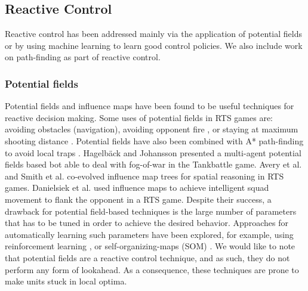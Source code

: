 \documentclass{llncs}
\begin{document}



\subsection*{Reactive Control}

Reactive control has been addressed mainly via the application of potential fields or by using machine learning to learn good control policies. We also include work on path-finding as part of reactive control.


\subsubsection*{Potential  fields}
Potential  fields and  influence maps  have  been found  to be  useful
techniques for reactive decision making. Some uses of potential fields
in RTS  games are: avoiding obstacles  (navigation), avoiding opponent
fire \cite{uriarte2012kiting}, or staying at maximum shooting distance
\cite{Hagelback09}. Potential  fields have also been  combined with A*
path-finding  to avoid  local traps  \cite{Hagelback12}. Hagelb\"{a}ck
and  Johansson \cite{HagelbackJ08}  presented a  multi-agent potential
fields  based bot  able  to  deal with  fog-of-war  in the  Tankbattle
game. Avery et  al. \cite{Avery09} and Smith  et al. \cite{SmithCIG10}
co-evolved  influence   map  trees   for  spatial  reasoning   in  RTS
games. Danielsiek et al. \cite{Danielsiek_2008} used influence maps to
achieve  intelligent squad  movement to  flank the  opponent in  a RTS
game.  Despite their  success,  a drawback  for potential  field-based
techniques is the  large number of parameters that has  to be tuned in
order to  achieve the  desired behavior. Approaches  for automatically
learning  such  parameters  have  been explored,  for  example,  using
reinforcement learning \cite{Liu_2008},  or self-organizing-maps (SOM)
\cite{teamCompositionRTS}. We would like to note that potential fields
are a reactive control technique, and as such, they do not perform any
form of  lookahead. As  a consequence, these  techniques are  prone to
make units stuck in local optima.
\end{document}
